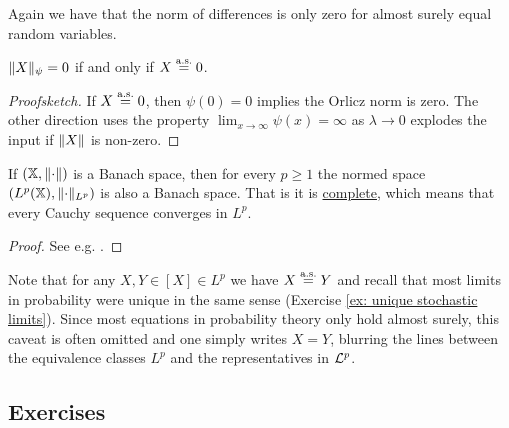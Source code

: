 Again we have that the norm of differences is only zero for almost surely equal
random variables.

\begin{fact}
    \(\lVert X\rVert_\psi = 0\) if and only if \(X\overset{\operatorname{\text{a.s.}}}= 0\).
\end{fact}
\begin{proof}[Proofsketch]
    If \(X \overset{\operatorname{\text{a.s.}}}= 0\), then \(\psi(0)=0\) implies the Orlicz
    norm is zero. The other direction uses the property \(\lim_{x\to\infty}
    \psi(x) = \infty\) as \(\lambda \to 0\) explodes the input if \(\lVert X\rVert\)
    is non-zero.
\end{proof}

\begin{fact}
    \label{fact: Lp complete}
    If \((\mathbb{X}, \lVert\cdot\rVert)\) is a Banach space, then for every \(p \ge 1\)
    the normed space \((L^p(\mathbb{X}), \lVert\cdot\rVert_{L^p})\) is
    also a Banach space. That is it is \underline{complete},
    which means that every Cauchy sequence converges in \(L^p\). 
\end{fact}
\begin{proof}
See e.g. \citep[Thm.~6.25 and 7.3]{klenkeProbabilityTheoryComprehensive2014}.
\end{proof}

Note that for any \(X,Y\in [X] \in L^p\) we have \(X\overset{\operatorname{\text{a.s.}}}= Y\)
and recall that most limits in probability were unique in the same sense
(Exercise \ref{ex: unique stochastic limits}).
Since most equations in probability theory only hold almost surely, this caveat
is often omitted and one simply writes \(X=Y\), blurring the lines
between the equivalence classes \(L^p\) and the representatives in \(\mathcal{L}^p\).

\subsection*{Exercises}

